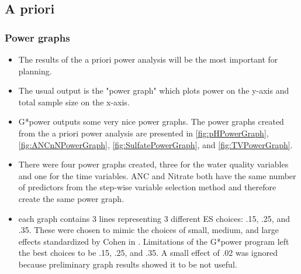 \subsection{A priori}
\subsubsection{Power graphs}
\begin{itemize}
	\item The results of the a priori power analysis will be the most important for planning.
	\item The usual output is the "power graph" which plots power on the y-axis and total sample size on the x-axis.
	\item G*power outputs some very nice power graphs. The power graphs created from the a priori power analysis are presented in \autoref{fig:pHPowerGraph}, \autoref{fig:ANCnNPowerGraph}, \autoref{fig:SulfatePowerGraph}, and \autoref{fig:TVPowerGraph}.
	\item There were four power graphs created, three for the water quality variables and one for the time variables.  ANC and Nitrate both have the same number of predictors from the step-wise variable selection method and therefore create the same power graph. 
	\item each graph contains 3 lines representing 3 different ES choices: .15, .25, and .35.  These were chosen to mimic the choices of small, medium, and large effects standardized by Cohen in \citep{cohen1992power}.  Limitations of the G*power program left the best choices to be .15, .25, and .35.   A small effect of .02 was ignored because preliminary graph results showed it to be  not useful.	
\end{itemize}
